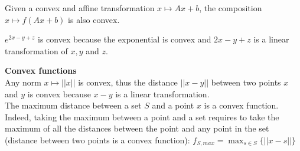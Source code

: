 %
\vspace{0.5cm}
\begin{property}
 Given a convex and affine transformation $ x \mapsto Ax + b $, the composition $x \mapsto f(Ax + b)$ is also convex.
 \end{property}
 \begin{example}
\begin{leftbar}
	$e^{2x - y + z}$ is convex because the exponential is convex and  $2x - y + z$ is a linear transformation of $x, y$ and $z$.
	\end{leftbar}
	\end{example}
	
  \begin{example}
\begin{leftbar}	
	\textbf{Convex functions}\\
	Any norm $x \mapsto ||x ||$ is convex, thus the distance $||x-y||$ between two points $x$ and $y$ is convex because $x-y$ is a linear transformation.\\
    The maximum distance between a set $S$ and a point $x$ is a convex function. Indeed, taking the maximum between a point and a set requires to take the maximum of all the distances between the point and any point in the set (distance between two points is a convex function): $f_{S,max} = \max_{s \in S}\{ ||x - s|| \}$ 
	\end{leftbar}
	\end{example}
    
